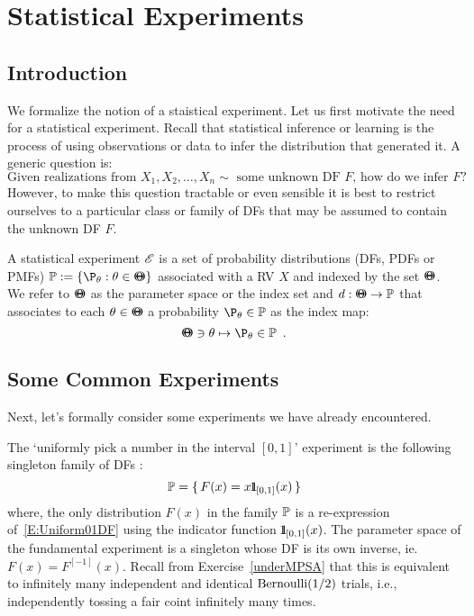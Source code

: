 \chapter{Statistical Experiments}\label{S:StatExps}
\section{Introduction}
We formalize the notion of a staistical experiment.  Let us first motivate the need for a statistical experiment.  Recall that statistical inference or learning is the process of using observations or data to infer the distribution that generated it.  A generic question is:
\[
\text{Given realizations from $X_1, X_2, \ldots, X_n \sim$ some unknown DF $F$, how do we infer $F$} ?
\]
However, to make this question tractable or even sensible it is best to restrict ourselves to a particular  class or family of DFs that may be assumed to contain the unknown DF $F$.

\begin{definition}[Experiment]
A statistical experiment $\mathscr{E}$ is a set of probability distributions (DFs, PDFs or PMFs) 
$\Pz := \{\P_{\theta} : \theta \in \BB{\Theta} \}$ associated with a RV $X$ and indexed by the set ${\Theta}\mspace{-11 mu}{\Theta}$.  
We refer to ${\Theta}\mspace{-11 mu}{\Theta}$ as the parameter space or the index set and $d:{\Theta}\mspace{-11 mu}{\Theta} \rightarrow \mathbb{P}$ that associates to each $\theta \in {\Theta}\mspace{-11 mu}{\Theta}$ a probability $\P_{\theta} \in \Pz$ as the index map:
\[ \BB{\Theta} \ni \theta \mapsto \P_{\theta} \in \Pz \enspace .\]
\end{definition}

\section{Some Common Experiments}
Next, let's formally consider some experiments we have already encountered.
\begin{Exp}\label{Exp:Uniform01}
The `uniformly pick a number in the interval $[0,1]$' experiment is the following singleton family of DFs  :
\[
\mathbb{P} = \{ \,  F(x) = x {1}\mspace{-11 mu}{1}_{[0,1]}(x)  \, \} 
\]
where, the only distribution $F(x)$ in the family $\mathbb{P}$ is a re-expression of~\eqref{E:Uniform01DF} using the indicator function ${1}\mspace{-11 mu}{1}_{[0,1]}(x)$.  The parameter space of the fundamental experiment is a singleton whose DF is its own inverse, ie.~$F(x) = F^{[-1]}(x)$. 
Recall from Exercise~\ref{underMPSA} that this is equivalent to infinitely many independent and identical $\mbox{{\rm Bernoulli}}(1/2)$ trials, i.e., independently tossing a fair coint infinitely many times.
\end{Exp}

